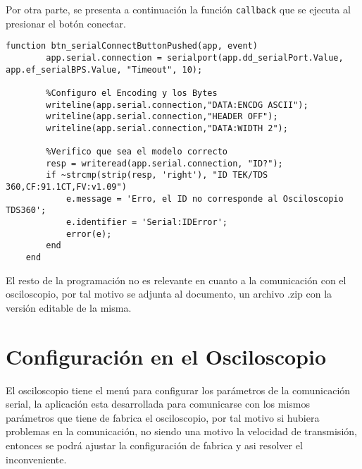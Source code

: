 Por otra parte, se presenta a continuación la función \texttt{callback} que se ejecuta al presionar el botón conectar.

\begin{lstlisting}[style=Matlab, firstnumber=last]
	function btn_serialConnectButtonPushed(app, event)
		app.serial.connection = serialport(app.dd_serialPort.Value, app.ef_serialBPS.Value, "Timeout", 10);
		
		%Configuro el Encoding y los Bytes
		writeline(app.serial.connection,"DATA:ENCDG ASCII");
		writeline(app.serial.connection,"HEADER OFF");
		writeline(app.serial.connection,"DATA:WIDTH 2");
		
		%Verifico que sea el modelo correcto
		resp = writeread(app.serial.connection, "ID?");
		if ~strcmp(strip(resp, 'right'), "ID TEK/TDS 360,CF:91.1CT,FV:v1.09")
			e.message = 'Erro, el ID no corresponde al Osciloscopio TDS360';
			e.identifier = 'Serial:IDError';
			error(e);                        
		end
	end
\end{lstlisting}

El resto de la programación no es relevante en cuanto a la comunicación con el osciloscopio, por tal motivo se adjunta al documento, un archivo .zip con la versión editable de la misma.

\section{Configuración en el Osciloscopio}
El osciloscopio tiene el menú para configurar los parámetros de la comunicación serial, la aplicación esta desarrollada para comunicarse con los mismos parámetros que tiene de fabrica el osciloscopio, por tal motivo si hubiera problemas en la comunicación, no siendo una motivo la velocidad de transmisión, entonces se podrá ajustar la configuración de fabrica y asi resolver el inconveniente.









